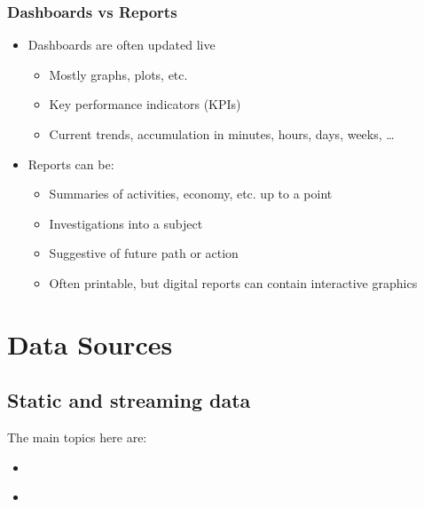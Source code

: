 \documentclass[letterpaper,10pt,english]{jupyterBook}
\begin{document}
\section{Dashboards vs Reports}
\label{\detokenize{1_Decision_making/Dashboards_reports:dashboards-vs-reports}}\label{\detokenize{1_Decision_making/Dashboards_reports::doc}}\begin{itemize}
\item {} 
\sphinxAtStartPar
Dashboards are often updated live
\begin{itemize}
\item {} 
\sphinxAtStartPar
Mostly graphs, plots, etc.

\item {} 
\sphinxAtStartPar
Key performance indicators (KPIs)

\item {} 
\sphinxAtStartPar
Current trends, accumulation in minutes, hours, days, weeks, …

\end{itemize}

\item {} 
\sphinxAtStartPar
Reports can be:
\begin{itemize}
\item {} 
\sphinxAtStartPar
Summaries of activities, economy, etc. up to a point

\item {} 
\sphinxAtStartPar
Investigations into a subject

\item {} 
\sphinxAtStartPar
Suggestive of future path or action

\item {} 
\sphinxAtStartPar
Often printable, but digital reports can contain interactive graphics

\end{itemize}

\end{itemize}

\sphinxstepscope


\part{Data Sources}

\sphinxstepscope


\chapter{Static and streaming data}
\label{\detokenize{2_Data_sources/Formats/Formats:static-and-streaming-data}}\label{\detokenize{2_Data_sources/Formats/Formats::doc}}
\sphinxAtStartPar
The main topics here are:
\begin{itemize}
\item {} 
\sphinxAtStartPar
{\hyperref[\detokenize{2_Data_sources/Formats/Data_formats::doc}]{}}

\item {} 
\sphinxAtStartPar
{\hyperref[\detokenize{2_Data_sources/Formats/Streaming_data::doc}]{}}

\end{itemize}
\end{document}
